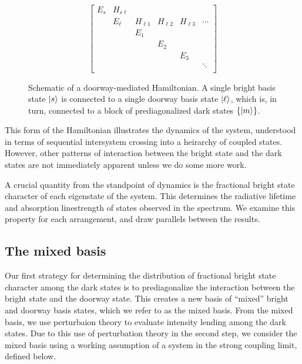 \begin{figure}
  \caption{Schematic of a doorway-mediated Hamiltonian. A single
    bright basis state $\mathinner{|{s}\rangle}$ is connected to a single doorway
    basis state $\mathinner{|{\ell}\rangle}$, which is, in turn, connected to a block
    of prediagonalized dark states $\lbrace \mathinner{|{m}\rangle} \rbrace$.}
  \label{fig:matrix-doorway}
  \begin{equation*}
    \begin{bmatrix}
    E_s & H_{s \ell} \\
    & E_\ell & H_{\ell 1} & H_{\ell 2} & H_{\ell 3} & \dotsm \\
    & & E_1 \\
    & & & E_2 \\
    & & & & E_3 \\
    & & & & & \ddots \\
    \end{bmatrix}
  \end{equation*}
\end{figure}

This form of the Hamiltonian illustrates the dynamics of the system,
understood in terms of sequential intersystem crossing into a
heirarchy of coupled states. However, other patterns of interaction
between the bright state and the dark states are not immediately
apparent unless we do some more work.

A crucial quantity from the standpoint of dynamics is the fractional
bright state character of each eigenstate of the system. This
determines the radiative lifetime and absorption linestrength of
states observed in the spectrum. We examine this property for each
arrangement, and draw parallels between the results.

\subsection{The mixed basis}
\label{sec:mixed-basis}

Our first strategy for determining the distribution of fractional
bright state character among the dark states is to prediagonalize the
interaction between the bright state and the doorway state.  This
creates a new basis of ``mixed'' bright and doorway basis states,
which we refer to as the mixed basis.  From the mixed basis, we use
perturbaion theory to evaluate intensity lending among the dark
states.  
Due to this use of perturbation theory in the second step, we consider
the mixed basis using a working assumption of a system in the strong
coupling limit, defined below.

